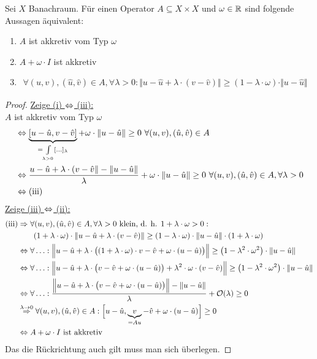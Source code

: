 \begin{lemma}
Sei $X$ Banachraum. Für einen Operator $A\subseteq X\times X$ und $\omega\in\mathbb{R}$ sind folgende Aussagen äquivalent:
\begin{enumerate}[label=(\roman*)]
\item $A$ ist akkretiv vom Typ $\omega$
\item $A+\omega\cdot I$ ist akkretiv
\item $\begin{aligned}\forall (u,v),(\hat{u},\hat{v})\in A,\forall\lambda>0:\Vert u-\hat{u}+\lambda\cdot(v-\hat{v})\Vert\geq(1-\lambda\cdot\omega)\cdot\Vert u-\hat{u}\Vert
\end{aligned}$
\end{enumerate}
\end{lemma}
\begin{proof}
\underline{Zeige (i) $\Leftrightarrow$ (iii):}\\
$A$ ist akkretiv vom Typ $\omega$
\begin{align*}
&\Leftrightarrow\underbrace{[u-\hat{u},v-\hat{v}]}_{=\int\limits_{\lambda>0}[\ldots]_\lambda}
+ \omega\cdot\Vert u-\hat{u}\Vert\geq0~\forall(u,v),(\hat{u},\hat{v})\in A\\
&\Leftrightarrow\frac{u-\hat{u}+\lambda\cdot(v-\hat{v}\Vert-\Vert u-\hat{u}\Vert}{\lambda}+\omega\cdot\Vert u-\hat{u}\Vert\geq0~\forall(u,v),(\hat{u},\hat{v})\in A,\forall\lambda>0\\
&\Leftrightarrow\text{(iii)}
\end{align*}
\underline{Zeige (iii) $\Leftrightarrow$ (ii):}
\begin{align*}
\text{(iii)} &\Rightarrow\forall(u,v),(\hat{u},\hat{v})\in A,\forall\lambda>0\text{ klein, d. h. }1+\lambda\cdot\omega>0:\\
&\qquad(1+\lambda\cdot\omega)\cdot\Vert u-\hat{u}+\lambda\cdot(v-\hat{v})\Vert\geq(1-\lambda\cdot\omega)\cdot\Vert u-\hat{u}\Vert\cdot(1+\lambda\cdot\omega)\\
&\Leftrightarrow\forall\ldots:\Big\Vert u-\hat{u}+\lambda\cdot\big((1+\lambda\cdot\omega)\cdot v-\hat{v}+\omega\cdot(u-\hat{u})\big)\Big\Vert
\geq
\left(1-\lambda^2\cdot\omega^2\right)\cdot\Vert u-\hat{u}\Vert\\
&\Leftrightarrow\forall\ldots:
\Big\Vert u-\hat{u}+\lambda\cdot\big(v-\hat{v}+\omega\cdot(u-\hat{u})\big)+\lambda^2\cdot\omega\cdot(v-\hat{v})\Big\Vert
\geq
\left(1-\lambda^2\cdot\omega^2\right)\cdot\Vert u-\hat{u}\Vert\\
&\Leftrightarrow\forall\ldots:
\frac{\Big\Vert u-\hat{u}+\lambda\cdot\big(v-\hat{v}+\omega\cdot(u-\hat{u})\big)\Big\Vert-\Vert u-\hat{u}\Vert}{\lambda}+\mathcal{O}(\lambda)\geq0\\
&\stackrel{\lambda\to0}{\Rightarrow}
\forall(u,v),(\hat{u},\hat{v})\in A:\Big[ u-\hat{u},\underbrace{v}_{=Au}-\hat{v}+\omega\cdot(u-\hat{u})\Big]\geq0\\
&\Leftrightarrow A+\omega\cdot I\text{ ist akkretiv}
\end{align*}
Das die Rückrichtung auch gilt muss man sich überlegen.
\end{proof}

